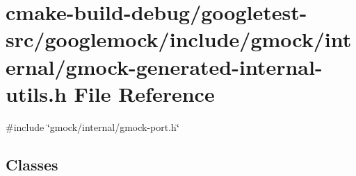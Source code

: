 \hypertarget{gmock-generated-internal-utils_8h}{}\section{cmake-\/build-\/debug/googletest-\/src/googlemock/include/gmock/internal/gmock-\/generated-\/internal-\/utils.h File Reference}
\label{gmock-generated-internal-utils_8h}
{\ttfamily \#include \char`\"{}gmock/internal/gmock-\/port.\+h\char`\"{}}\newline
\subsection*{Classes}
